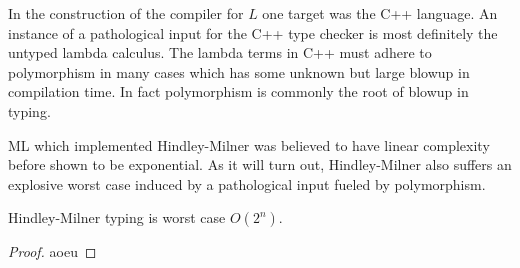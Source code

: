 \documentclass[11pt,oneside,a4paper]{report}
\begin{document}
In the construction of the compiler for $L$ one target was the C++ language.
An instance of a pathological input for the C++ type checker is most definitely the untyped lambda calculus.
The lambda terms in C++ must adhere to polymorphism in many cases which has some unknown but large blowup in compilation time.
In fact polymorphism is commonly the root of blowup in typing.

ML which implemented Hindley-Milner was believed to have linear complexity before shown to be exponential.
As it will turn out, Hindley-Milner also suffers an explosive worst case induced by a pathological input fueled by polymorphism.

\begin{lemma}
    Hindley-Milner typing is worst case $O(2^n)$.
\end{lemma}
\begin{proof}
    aoeu
\end{proof}
\end{document}
